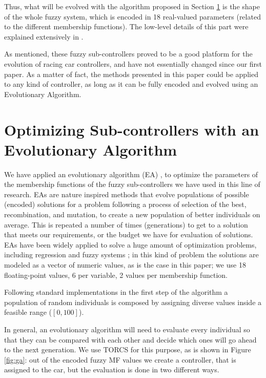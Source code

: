 \documentclass[10pt,journal,compsoc]{IEEEtran}
\begin{document}
Thus, what will be evolved with the algorithm proposed in Section
\ref{sec:ga} is the shape of the whole fuzzy system, which is encoded
in 18 real-valued parameters (related to the different membership
functions). The low-level details of this part were explained
extensively in \cite{DBLP:conf/cig/SalemMG19}. 

As mentioned, these fuzzy sub-controllers proved to be a good platform for the evolution of racing car controllers, and have not essentially changed since our first paper. As a matter of fact, the methods presented in this paper could
be applied to any kind of controller, as long as it can be fully
encoded and evolved using an Evolutionary Algorithm. 

\section{Optimizing Sub-controllers with an Evolutionary Algorithm}
\label{sec:ga}

We have applied an evolutionary algorithm (EA) \cite{EAs_Back96}, to optimize the parameters of the membership functions of the fuzzy sub-controllers we have used in this line of research.
EAs are nature inspired methods that evolve populations of possible (encoded) solutions for a problem following a process of selection of the best,
recombination, and mutation, to create a new population of better individuals on average. This is repeated a number of times
(generations) to get to a solution that meets our requirements, or the
budget we have for evaluation of solutions. EAs have been widely
applied to solve a huge amount of optimization problems, including regression and fuzzy systems \cite{hoffmann2001evolutionary}; in this kind of problem the solutions are modeled as a vector of numeric values, as is the
case in this paper; we use 18 floating-point values, 6 per variable, 2 values per membership function.

Following standard implementations in the first step of the algorithm \cite{salem_evo18} a
population of random individuals is composed by assigning diverse values inside a feasible range ($[0,100]$).

In general, an evolutionary algorithm will need to evaluate every
individual so that they can be compared with each other and decide
which ones will go ahead to the next generation. We use TORCS for this
purpose, as is shown in Figure \ref{fig:ga}: out of the encoded fuzzy
MF values we create a controller, that is assigned to the car, but the evaluation is done in two different ways.
\end{document}
